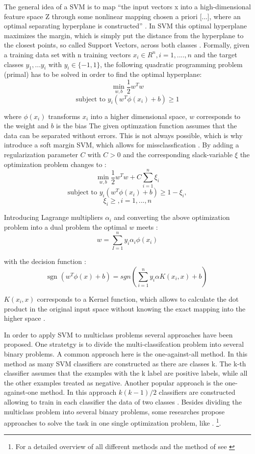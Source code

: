 \documentclass[12pt, a4paper, titlepage]{article}
\begin{document}
The general idea of a \ac{SVM} is to map ``the input vectors x into a high-dimensional feature space Z through some nonlinear mapping chosen a priori [...], where an optimal separating hyperplane is constructed'' \citep[138]{Vapnik2000}. In \ac{SVM} this optimal hyperplane maximizes the margin, which is simply put the distance from the hyperplane to the closest points, so called Support Vectors, across both classes \citep{Han2012}. Formally, given a training data set with n training vectors $x_i \in R^n, i = 1,....,n$ and the target classes $y_1,...y_i$ with $y_i \in \{-1, 1\}$, the following quadratic programming problem (primal) has to be solved in order to find the optimal hyperplane:
\[\min_{w,b} \frac{1}{2}w^{T}w \] 
\[\text{subject to } y_i(w^T\phi(x_i)+b) \geq 1\]

where $\phi(x_i)$ transforms $x_i$ into a higher dimensional space, $w$ corresponds to the weight and $b$ is the bias \citep{Chang2001,Jordan2006}
The given optimzation function assumes that the data can be separated without errors. This is not always possible, which is why \cite{Cortes1995} introduce a soft margin \ac{SVM}, which allows for missclassfication \citep{Vapnik2000}.
By adding a regularization parameter $C$ with $C > 0$ and the corresponding slack-variable $\xi$ the optimization problem changes to \citep{Chang2001, Han2012}: 
\[\min_{w,b} \frac{1}{2}w^{T}w + C \sum_{i=1}^n \xi_i \] 
\[\text{subject to } y_i(w^T\phi(x_i)+b) \geq 1 - \xi_i, \] 
\[\xi_i \geq, i = 1,...,n\]

Introducing Lagrange multipliers $\alpha_i$ and converting the above optimization problem into a dual problem the optimal $w$ meets \citep{Chang2001, Jordan2006}:
\[w = \sum_{I=1}^n y_i\alpha_i\phi(x_i)\]

with the decision function \citep{Chang2001}:
\[\text{sgn } (w^T\phi(x)+b) = sgn(\sum_{i=1}^n y_i \alpha K(x_i, x) +b)\]

$K(x_i, x)$ corresponds to a Kernel function, which allows to calculate the dot product in the original input space without knowing the exact mapping into the higher space \citep{Han2012, Jordan2006}. 

In order to apply \ac{SVM} to multiclass problems several approaches have been proposed. One stratetgy is to divide the multi-classifcation problem into several binary problems. A common approach here is the one-against-all method. In this method as many \ac{SVM} classifiers are constructed as there are classes k. The k-th classifier assumes that the examples with the k label are positive labels, while all the other examples treated as negative. Another popular approach is the one-against-one method. In this approach $k(k-1)/2$ classifiers are constructed allowing to train in each classifier the data of two classes \citep{Hsu2002}. Besides dividing the multiclass problem into several binary problems, some researches propose approaches to solve the task in one single optimization problem, like \citet{Crammer2001}. \footnote{For a detailed overview of all different methods and the method of \citet{Crammer2001} see \citet{Hsu2002,Crammer2001}}. 
\end{document}
